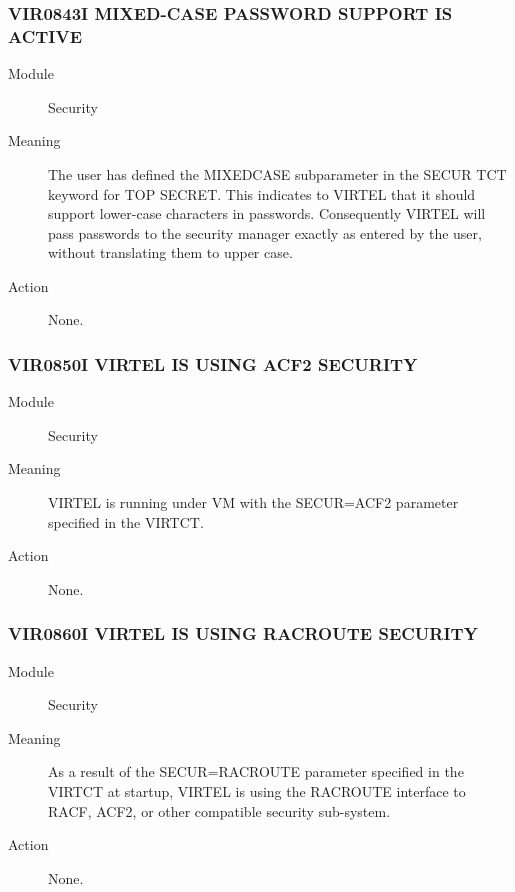 \documentclass[letterpaper,10pt,english]{sphinxmanual}
\begin{document}
\subsubsection{VIR0843I MIXED-CASE PASSWORD SUPPORT IS ACTIVE}
\label{\detokenize{messages:vir0843i-mixed-case-password-support-is-active}}\begin{description}
\item[{Module}] \leavevmode
Security

\item[{Meaning}] \leavevmode
The user has defined the MIXEDCASE subparameter in the SECUR TCT keyword for TOP SECRET. This indicates to VIRTEL that it should support lower-case characters in passwords. Consequently VIRTEL will pass passwords to the security manager exactly as entered by the user, without translating them to upper case.

\item[{Action}] \leavevmode
None.

\end{description}


\subsubsection{VIR0850I VIRTEL IS USING ACF2 SECURITY}
\label{\detokenize{messages:vir0850i-virtel-is-using-acf2-security}}\begin{description}
\item[{Module}] \leavevmode
Security

\item[{Meaning}] \leavevmode
VIRTEL is running under VM with the SECUR=ACF2 parameter specified in the VIRTCT.

\item[{Action}] \leavevmode
None.

\end{description}


\subsubsection{VIR0860I VIRTEL IS USING RACROUTE SECURITY}
\label{\detokenize{messages:vir0860i-virtel-is-using-racroute-security}}\begin{description}
\item[{Module}] \leavevmode
Security

\item[{Meaning}] \leavevmode
As a result of the SECUR=RACROUTE parameter specified in the VIRTCT at startup, VIRTEL is using the RACROUTE interface to RACF, ACF2, or other compatible security sub-system.

\item[{Action}] \leavevmode
None.

\end{description}
\end{document}
